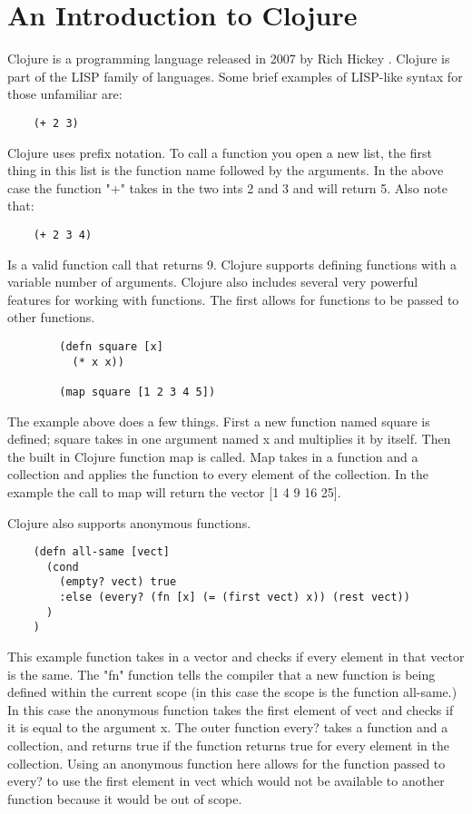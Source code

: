 \documentclass[12pt]{article}
\begin{document}
\section{An Introduction to Clojure}\label{sec:intro}
	Clojure is a programming language released in 2007 by Rich Hickey \cite{wiki}. Clojure is part of the LISP family of languages. Some brief examples of LISP-like syntax for those unfamiliar are:
	\begin{verbatim}
	(+ 2 3)
	\end{verbatim}
	Clojure uses prefix notation. To call a function you open a new list, the first thing in this list is the function name followed by the arguments. In the above case the function "+" takes in the two ints 2 and 3 and will return 5. Also note that:
	\begin{verbatim}
	(+ 2 3 4)
	\end{verbatim}
	Is a valid function call that returns 9. Clojure supports defining functions with a variable number of arguments. Clojure also includes several very powerful features for working with functions. The first allows for functions to be passed to other functions. 
	\begin{verbatim}
		(defn square [x] 
		  (* x x))
		
		(map square [1 2 3 4 5])
	\end{verbatim}
	The example above does a few things. First a new function named square is defined; square takes in one argument named x and multiplies it by itself. Then the built in Clojure function map is called. Map takes in a function and a collection and applies the function to every element of the collection. In the example the call to map will return the vector [1 4 9 16 25]. 
	
	Clojure also supports anonymous functions. 
	\begin{verbatim}
	(defn all-same [vect]
      (cond 
        (empty? vect) true
        :else (every? (fn [x] (= (first vect) x)) (rest vect)) 
      )
    )
	\end{verbatim}
	This example function takes in a vector and checks if every element in that vector is the same. The "fn" function tells the compiler that a new function is being defined within the current scope (in this case the scope is the function all-same.) In this case the anonymous function takes the first element of vect and checks if it is equal to the argument x. The outer function every? takes a function and a collection, and returns true if the function returns true for every element in the collection. Using an anonymous function here allows for the function passed to every? to use the first element in vect which would not be available to another function because it would be out of scope.
\end{document}
